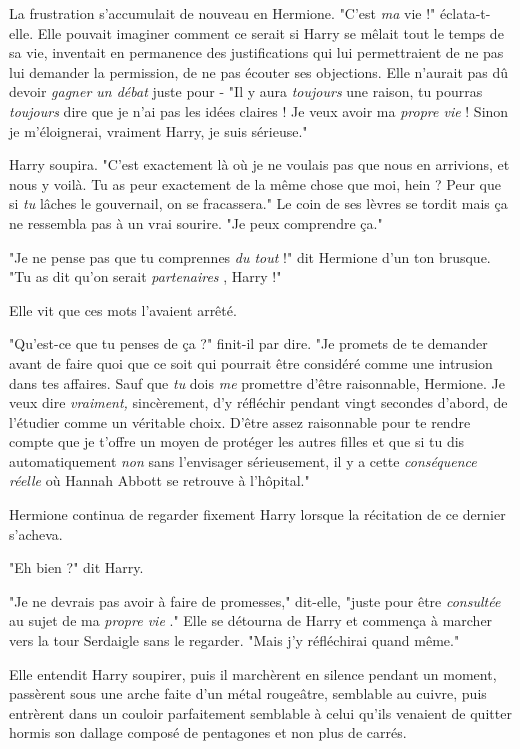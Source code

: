 La frustration s'accumulait de nouveau en Hermione. "C'est \emph{ma}  vie !" éclata-t-elle. Elle pouvait imaginer comment ce serait si Harry se mêlait tout le temps de sa vie, inventait en permanence des justifications qui lui permettraient de ne pas lui demander la permission, de ne pas écouter ses objections. Elle n'aurait pas dû devoir \emph{gagner un débat}  juste pour - "Il y aura \emph{toujours}  une raison, tu pourras \emph{toujours } dire que je n'ai pas les idées claires ! Je veux avoir ma \emph{propre vie}  ! Sinon je m'éloignerai, vraiment Harry, je suis sérieuse."

Harry soupira. "C'est exactement là où je ne voulais pas que nous en arrivions, et nous y voilà. Tu as peur exactement de la même chose que moi, hein ? Peur que si \emph{tu}  lâches le gouvernail, on se fracassera." Le coin de ses lèvres se tordit mais ça ne ressembla pas à un vrai sourire. "Je peux comprendre ça."

"Je ne pense pas que tu comprennes \emph{du tout } !" dit Hermione d'un ton brusque. "Tu as dit qu'on serait \emph{partenaires} , Harry !"

Elle vit que ces mots l'avaient arrêté.

"Qu'est-ce que tu penses de ça ?" finit-il par dire. "Je promets de te demander avant de faire quoi que ce soit qui pourrait être considéré comme une intrusion dans tes affaires. Sauf que \emph{tu } dois \emph{me } promettre d'être raisonnable, Hermione. Je veux dire \emph{vraiment, } sincèrement, d'y réfléchir pendant vingt secondes d'abord, de l'étudier comme un véritable choix. D'être assez raisonnable pour te rendre compte que je t'offre un moyen de protéger les autres filles et que si tu dis automatiquement \emph{non}  sans l'envisager sérieusement, il y a cette \emph{conséquence réelle}  où Hannah Abbott se retrouve à l'hôpital."

Hermione continua de regarder fixement Harry lorsque la récitation de ce dernier s'acheva.

"Eh bien ?" dit Harry.

"Je ne devrais pas avoir à faire de promesses," dit-elle, "juste pour être \emph{consultée}  au sujet de ma \emph{propre vie} ." Elle se détourna de Harry et commença à marcher vers la tour Serdaigle sans le regarder. "Mais j'y réfléchirai quand même."

Elle entendit Harry soupirer, puis il marchèrent en silence pendant un moment, passèrent sous une arche faite d'un métal rougeâtre, semblable au cuivre, puis entrèrent dans un couloir parfaitement semblable à celui qu'ils venaient de quitter hormis son dallage composé de pentagones et non plus de carrés.

